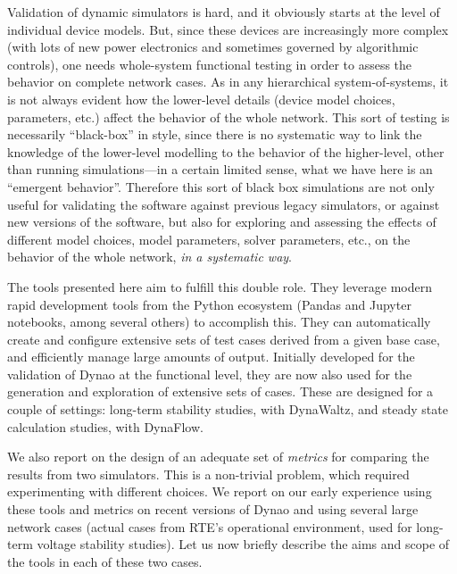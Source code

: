 \documentclass[conference]{IEEEtran}
\newcommand{\Dynawo}{Dyna\textomega o\xspace} %
\begin{document}

Validation of dynamic simulators is hard, and it obviously starts at the level
of individual device models. But, since these devices are increasingly more
complex (with lots of new power electronics and sometimes governed by
algorithmic controls), one needs whole-system functional testing in order to
assess the behavior on complete network cases. As in any hierarchical
system-of-systems, it is not always evident how the lower-level details (device
model choices, parameters, etc.)  affect the behavior of the whole network. This
sort of testing is necessarily ``black-box'' in style, since there is no
systematic way to link the knowledge of the lower-level modelling to the behavior
of the higher-level, other than running simulations---in a certain limited
sense, what we have here is an ``emergent behavior''.  Therefore this sort of
black box simulations are not only useful for validating the software against
previous legacy simulators, or against new versions of the software, but also
for exploring and assessing the effects of different model choices, model
parameters, solver parameters, etc., on the behavior of the whole network,
\emph{in a systematic way}.

The tools presented here aim to fulfill this double role. They leverage modern
rapid development tools from the Python ecosystem (Pandas and Jupyter notebooks,
among several others) to accomplish this. They can automatically create and
configure extensive sets of test cases derived from a given base case, and
efficiently manage large amounts of output. Initially developed for the
validation of \Dynawo at the functional level, they are now also used for the
generation and exploration of extensive sets of cases. These are designed for a
couple of settings: long-term stability studies, with DynaWaltz, and steady
state calculation studies, with DynaFlow.

We also report on the design of an adequate set of \emph{metrics} for comparing
the results from two simulators.  This is a non-trivial problem, which required
experimenting with different choices.  We report on our early experience using
these tools and metrics on recent versions of \Dynawo and using several large
network cases (actual cases from RTE's operational environment, used for
long-term voltage stability studies). Let us now briefly describe the aims and
scope of the tools in each of these two cases.
\end{document}
